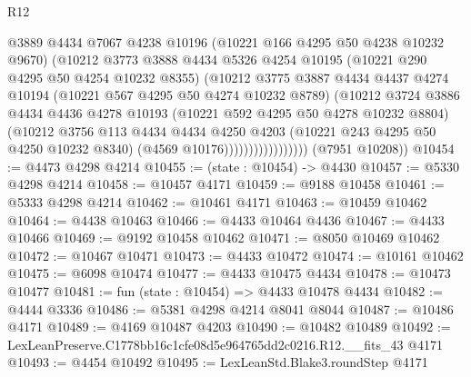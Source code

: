 \begin{lexlean}{R12}
\begin{coremodule}
                              @3889
                              @4434
                              @7067
                              @4238
                              @10196
                              (@10221 @166 @4295 @50 @4238 @10232 @9670)
                              (@10212
                                @3773
                                @3888
                                @4434
                                @5326
                                @4254
                                @10195
                                (@10221 @290 @4295 @50 @4254 @10232 @8355)
                                (@10212
                                  @3775
                                  @3887
                                  @4434
                                  @4437
                                  @4274
                                  @10194
                                  (@10221 @567 @4295 @50 @4274 @10232 @8789)
                                  (@10212
                                    @3724
                                    @3886
                                    @4434
                                    @4436
                                    @4278
                                    @10193
                                    (@10221 @592 @4295 @50 @4278 @10232 @8804)
                                    (@10212
                                      @3756
                                      @113
                                      @4434
                                      @4434
                                      @4250
                                      @4203
                                      (@10221 @243 @4295 @50 @4250 @10232 @8340)
                                      (@4569 @10176)))))))))))))))))
      (@7951 @10208))
@10454 := @4473 @4298 @4214
@10455 := (state : @10454) -> @4430
@10457 := @5330 @4298 @4214
@10458 := @10457 @4171
@10459 := @9188 @10458
@10461 := @5333 @4298 @4214
@10462 := @10461 @4171
@10463 := @10459 @10462
@10464 := @4438 @10463
@10466 := @4433 @10464 @4436
@10467 := @4433 @10466
@10469 := @9192 @10458 @10462
@10471 := @8050 @10469 @10462
@10472 := @10467 @10471
@10473 := @4433 @10472
@10474 := @10161 @10462
@10475 := @6098 @10474
@10477 := @4433 @10475 @4434
@10478 := @10473 @10477
@10481 := fun (state : @10454) => @4433 @10478 @4434
@10482 := @4444 @3336
@10486 := @5381 @4298 @4214 @8041 @8044
@10487 := @10486 @4171
@10489 := @4169 @10487 @4203
@10490 := @10482 @10489
@10492 := LexLeanPreserve.C1778bb16c1cfe08d5e964765dd2c0216.R12.__fits_43 @4171
@10493 := @4454 @10492
@10495 := LexLeanStd.Blake3.roundStep @4171

\end{coremodule}
\end{lexlean}
